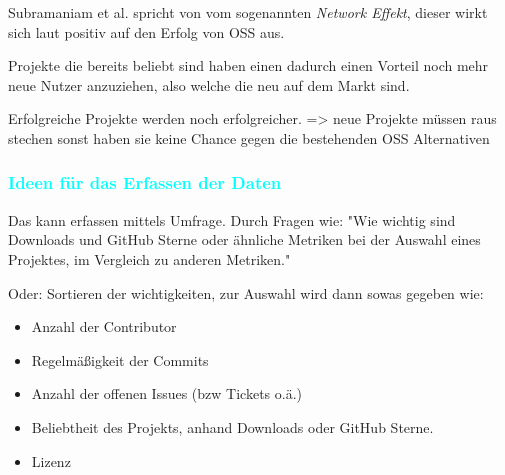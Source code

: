 Subramaniam et al. spricht von vom sogenannten \textit{Network Effekt},
dieser wirkt sich laut \cite{subramaniamDeterminantsOpenSource2009} %
positiv auf den Erfolg von OSS aus.

Projekte die bereits beliebt sind haben einen dadurch einen Vorteil noch mehr neue Nutzer anzuziehen, 
also welche die neu auf dem Markt sind.

\begin{hypothesis}
    Erfolgreiche Projekte werden noch erfolgreicher. => neue Projekte müssen raus stechen
    sonst haben sie keine Chance gegen die bestehenden OSS Alternativen
\end{hypothesis}




\subsubsection*{\textcolor{cyan}{Ideen für das Erfassen der Daten}}

Das kann erfassen mittels Umfrage. Durch Fragen wie: "Wie wichtig sind Downloads und GitHub
Sterne oder ähnliche Metriken bei der Auswahl eines Projektes, im Vergleich zu anderen Metriken."

Oder: Sortieren der wichtigkeiten, zur Auswahl wird dann sowas gegeben wie:
\begin{itemize}
    \item Anzahl der Contributor
    \item Regelmäßigkeit der Commits
    \item Anzahl der offenen Issues (bzw Tickets o.ä.)
    \item Beliebtheit des Projekts, anhand Downloads oder GitHub Sterne.
    \item Lizenz
\end{itemize}